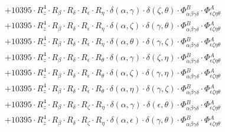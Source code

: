\documentclass{article}
\begin{document}
\begin{equation}
\begin{array}{c}
 \\[0.2em] 		 + 10395 \cdot R_{z}^{4} \cdot R_{\beta{}} \cdot R_{\delta{}} \cdot R_{\epsilon{}} \cdot R_{\eta{}} \cdot \delta{}\left(\alpha{}, \gamma{}\right) \cdot \delta{}\left(\zeta{}, \theta{}\right) \cdot \Phi{}^{B}_{\alpha{}\beta{}\gamma{}\delta{}} \cdot \Phi{}^{A}_{\epsilon{}\zeta{}\eta{}\theta{}} 
 \\[0.2em] 		 + 10395 \cdot R_{z}^{4} \cdot R_{\beta{}} \cdot R_{\delta{}} \cdot R_{\epsilon{}} \cdot R_{\eta{}} \cdot \delta{}\left(\alpha{}, \zeta{}\right) \cdot \delta{}\left(\gamma{}, \theta{}\right) \cdot \Phi{}^{B}_{\alpha{}\beta{}\gamma{}\delta{}} \cdot \Phi{}^{A}_{\epsilon{}\zeta{}\eta{}\theta{}} 
 \\[0.2em] 		 + 10395 \cdot R_{z}^{4} \cdot R_{\beta{}} \cdot R_{\delta{}} \cdot R_{\epsilon{}} \cdot R_{\eta{}} \cdot \delta{}\left(\alpha{}, \theta{}\right) \cdot \delta{}\left(\gamma{}, \zeta{}\right) \cdot \Phi{}^{B}_{\alpha{}\beta{}\gamma{}\delta{}} \cdot \Phi{}^{A}_{\epsilon{}\zeta{}\eta{}\theta{}} 
 \\[0.2em] 		 + 10395 \cdot R_{z}^{4} \cdot R_{\beta{}} \cdot R_{\delta{}} \cdot R_{\epsilon{}} \cdot R_{\theta{}} \cdot \delta{}\left(\alpha{}, \gamma{}\right) \cdot \delta{}\left(\zeta{}, \eta{}\right) \cdot \Phi{}^{B}_{\alpha{}\beta{}\gamma{}\delta{}} \cdot \Phi{}^{A}_{\epsilon{}\zeta{}\eta{}\theta{}} 
 \\[0.2em] 		 + 10395 \cdot R_{z}^{4} \cdot R_{\beta{}} \cdot R_{\delta{}} \cdot R_{\epsilon{}} \cdot R_{\theta{}} \cdot \delta{}\left(\alpha{}, \zeta{}\right) \cdot \delta{}\left(\gamma{}, \eta{}\right) \cdot \Phi{}^{B}_{\alpha{}\beta{}\gamma{}\delta{}} \cdot \Phi{}^{A}_{\epsilon{}\zeta{}\eta{}\theta{}} 
 \\[0.2em] 		 + 10395 \cdot R_{z}^{4} \cdot R_{\beta{}} \cdot R_{\delta{}} \cdot R_{\epsilon{}} \cdot R_{\theta{}} \cdot \delta{}\left(\alpha{}, \eta{}\right) \cdot \delta{}\left(\gamma{}, \zeta{}\right) \cdot \Phi{}^{B}_{\alpha{}\beta{}\gamma{}\delta{}} \cdot \Phi{}^{A}_{\epsilon{}\zeta{}\eta{}\theta{}} 
 \\[0.2em] 		 + 10395 \cdot R_{z}^{4} \cdot R_{\beta{}} \cdot R_{\delta{}} \cdot R_{\zeta{}} \cdot R_{\eta{}} \cdot \delta{}\left(\alpha{}, \gamma{}\right) \cdot \delta{}\left(\epsilon{}, \theta{}\right) \cdot \Phi{}^{B}_{\alpha{}\beta{}\gamma{}\delta{}} \cdot \Phi{}^{A}_{\epsilon{}\zeta{}\eta{}\theta{}} 
 \\[0.2em] 		 + 10395 \cdot R_{z}^{4} \cdot R_{\beta{}} \cdot R_{\delta{}} \cdot R_{\zeta{}} \cdot R_{\eta{}} \cdot \delta{}\left(\alpha{}, \epsilon{}\right) \cdot \delta{}\left(\gamma{}, \theta{}\right) \cdot \Phi{}^{B}_{\alpha{}\beta{}\gamma{}\delta{}} \cdot \Phi{}^{A}_{\epsilon{}\zeta{}\eta{}\theta{}} 

\end{array}
\end{equation}
\end{document}
